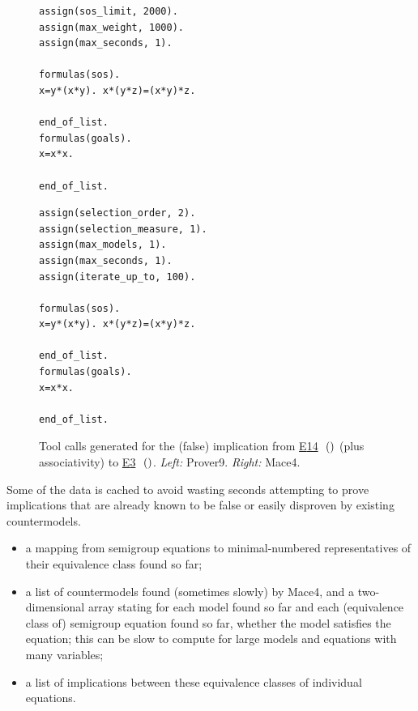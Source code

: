 \documentclass[12pt]{amsart}
\theoremstyle{plain}
\theoremstyle{definition}
\newcommand{\Equaref}[1]{\href{https://teorth.github.io/equational_theories/implications/?#1}{\textrm{\textup{E}}#1}}
\newcommand{\Equareffull}[1]{\Equaref{#1}\ifmmode\,\else\ \fi\ensuremath{(\csname Equa#1\endcsname)}}
\begin{document}
\begin{figure}\centering
\begin{minipage}[t]{40ex}
\begin{lstlisting}[basicstyle=\ttfamily\scriptsize,linewidth=30ex,frame=single]
assign(sos_limit, 2000).
assign(max_weight, 1000).
assign(max_seconds, 1).

formulas(sos).
x=y*(x*y). x*(y*z)=(x*y)*z.

end_of_list.
formulas(goals).
x=x*x.

end_of_list.
\end{lstlisting}
\end{minipage}\quad
\begin{minipage}[t]{40ex}
\begin{lstlisting}[basicstyle=\ttfamily\scriptsize,linewidth=35ex,frame=single]
assign(selection_order, 2).
assign(selection_measure, 1).
assign(max_models, 1).
assign(max_seconds, 1).
assign(iterate_up_to, 100).

formulas(sos).
x=y*(x*y). x*(y*z)=(x*y)*z.

end_of_list.
formulas(goals).
x=x*x.

end_of_list.
\end{lstlisting}
\end{minipage}
\caption{\label{fig:prover9-mace4}Tool calls generated for the (false) implication from \Equareffull{14} (plus associativity) to \Equareffull{3}. \emph{Left:} Prover9. \emph{Right:} Mace4.}
\end{figure}

Some of the data is cached to avoid wasting seconds attempting to prove implications that are already known to be false or easily disproven by existing countermodels.
\begin{itemize}
\item a mapping from semigroup equations to minimal-numbered representatives of their equivalence class found so far;

\item a list of countermodels found (sometimes slowly) by Mace4, and a two-dimensional array stating for each model found so far and each (equivalence class of) semigroup equation found so far, whether the model satisfies the equation; this can be slow to compute for large models and equations with many variables;

\item a list of implications between these equivalence classes of individual equations.
\end{itemize}
\end{document}
